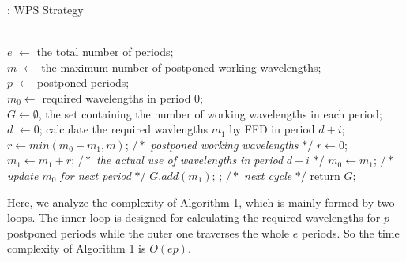 \documentclass[letter]{IEEEtran}
\begin{document}
\renewcommand{\algorithmicrequire}{ \textbf{Initialize:}}
\begin{algorithm}[h]
    \scriptsize
    \caption{: WPS Strategy}
    \begin{algorithmic}[1]
        \REQUIRE ~~\\
        $ e $ $ \leftarrow $ the total number of periods;\\
        $ m $ $ \leftarrow $ the maximum number of postponed working wavelengths;\\
        $ p $ $ \leftarrow $ postponed periods; \\
        $ m_{0} \leftarrow$ required wavelengths in period 0;\\
        $ G \leftarrow \emptyset$, the set containing the number of working wavelengths in each period;\\
        $ d $ $ \leftarrow 0 $; 
                \STATE calculate the required wavlengths $ m_{1} $ by FFD in period $ d + i $;\\
                    \STATE $ r \leftarrow min(m_{0} - m_{1}, m) $; $/*$ \textit{postponed working wavelengths} $*/$
                \ELSE
                    \STATE $ r \leftarrow 0 $;
                \ENDIF
                \STATE $ m_{1} \leftarrow m_{1} + r$; $/*$ \textit{the actual use of wavelengths in period} $d+i$ $*/$
                \STATE $ m_{0} \leftarrow m_{1}$;  $/*$ \textit{update $ m_{0} $ for next period} $*/$ 
                \STATE $G.add(m_{1})$;
        \ENDFOR
        ; $/*$ \textit{next cycle} $*/$
        \ENDWHILE
        \STATE return $G$;
    \end{algorithmic}
\end{algorithm}
\vspace{-5.0mm}
Here, we analyze the complexity of Algorithm 1, which is mainly formed by two loops. The inner loop is designed for calculating the required wavelengths for $p$ postponed periods while the outer one traverses the whole $e$ periods. So the time complexity of Algorithm 1 is $O(ep)$.
\vspace{-3.0mm}
\end{document}
